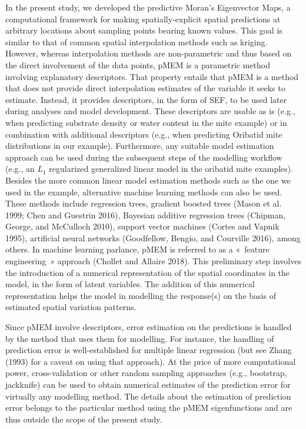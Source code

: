\documentclass[
]{article}
\begin{document}
In the present study, we developed the predictive Moran's Eigenvector
Maps, a computational framework for making spatially-explicit spatial
predictions at arbitrary locations about sampling points bearing known
values. This goal is similar to that of common spatial interpolation
methods such as kriging. However, whereas interpolation methods are
non-parametric and thus based on the direct involvement of the data
points, pMEM is a parametric method involving explanatory descriptors.
That property entails that pMEM is a method that does not provide direct
interpolation estimates of the variable it seeks to estimate. Instead,
it provides descriptors, in the form of SEF, to be used later during
analyses and model development. These descriptors are usable as is
(e.g., when predicting substrate density or water content in the mite
example) or in combination with additional descriptors (e.g., when
predicting Oribatid mite distributions in our example). Furthermore, any
suitable model estimation approach can be used during the subsequent
steps of the modelling workflow (e.g., an \(L_1\) regularized
generalized linear model in the oribatid mite examples). Besides the
more common linear model estimation methods such as the one we used in
the example, alternative machine learning methods can also be used.
These methods include regression trees, gradient boosted trees (Mason et
al. 1999; Chen and Guestrin 2016), Bayesian additive regression trees
(Chipman, George, and McCulloch 2010), support vector machines (Cortes
and Vapnik 1995), artificial neural networks (Goodfellow, Bengio, and
Courville 2016), among others. In machine learning parlance, pMEM is
referred to as a «~feature engineering~» approach (Chollet and Allaire
2018). This preliminary step involves the introduction of a numerical
representation of the spatial coordinates in the model, in the form of
latent variables. The addition of this numerical representation helps
the model in modelling the response(s) on the basis of estimated spatial
variation patterns.

Since pMEM involve descriptors, error estimation on the predictions is
handled by the method that uses them for modelling. For instance, the
handling of prediction error is well-established for multiple linear
regression (but see Zhang (1993) for a caveat on using that approach).
At the price of more computational power, cross-validation or other
random sampling approaches (e.g., bootstrap, jackknife) can be used to
obtain numerical estimates of the prediction error for virtually any
modelling method. The details about the estimation of prediction error
belongs to the particular method using the pMEM eigenfunctions and are
thus outside the scope of the present study.
\end{document}
